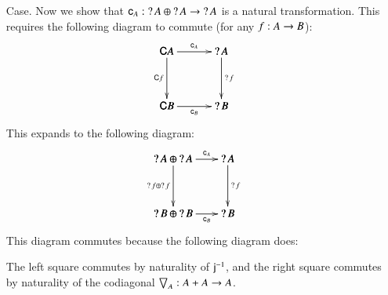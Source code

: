 \begin{itemize}
\item[Case.] Now we show that $\c{A} : \wn A \oplus \wn A \mto \wn
  A$ is a natural transformation.  This requires the following
  diagram to commute (for any $f : A \mto B$):
  \[
  \bfig
  \square[
    \func{C}A`
    \wn A`
    \func{C}B`
    \wn B;
    \c{A}`
    \func{C}f`
    \wn f`
    \c{B}]
  \efig
  \]
  This expands to the following diagram:
  \[
  \bfig
  \square[
    \wn A \oplus \wn A`
    \wn A`
    \wn B \oplus \wn B`
    \wn B;
    \c{A}`
    \wn f \oplus \wn f`
    \wn f`
    \c{B}]
  \efig
  \]
  This diagram commutes because the following diagram does:
  \begin{diagram}
  \end{diagram}
  The left square commutes by naturality of $\jinv{}$, and the right square commutes by naturality of the codiagonal
  $\bigtriangledown_{A} : A + A \mto A$.


\end{itemize}
